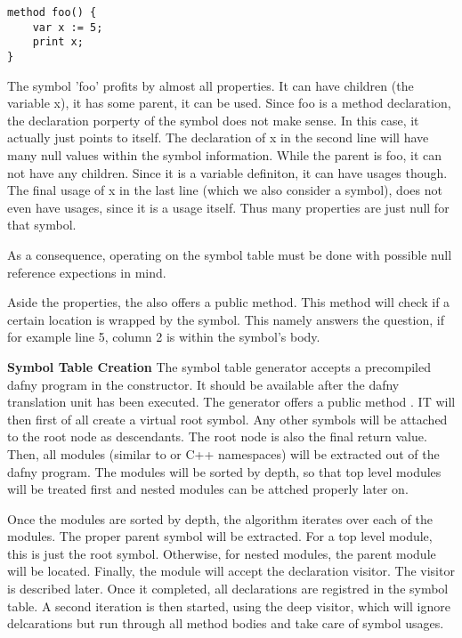 \begin{lstlisting}[language=dafny, caption={Example Code Regarding Symbol Information}, captionpos=b, label={lst:aldbkajds}]
method foo() {
    var x := 5;
    print x;
}
\end{lstlisting}

The symbol 'foo' profits by almost all properties. It can have children (the variable x), it has some parent, it can be used. Since foo is a method declaration, the declaration porperty of the symbol does not make sense. In this case, it actually just points to itself. The declaration of x in the second line will have many null values within the symbol information. While the parent is foo, it can not have any children. Since it is a variable definiton, it can have usages though. The final usage of x in the last line (which we also consider a symbol), does not even have usages, since it is a usage itself. Thus many properties are just null for that symbol.

As a consequence, operating on the symbol table must be done with possible null reference expections in mind.

Aside the properties, the  also offers a public method. This method will check if a certain location is wrapped by the symbol. This namely answers the question, if for example line 5, column 2 is within the symbol's body.

\textbf{Symbol Table Creation}
The symbol table generator accepts a precompiled dafny program in the constructor. It should be available after the dafny translation unit has been executed. The generator offers a public method . IT will then first of all create a virtual root symbol. Any other symbols will be attached to the root node as descendants. The root node is also the final return value.\\

Then, all modules (similar to \Csharp or C++ namespaces) will be extracted out of the dafny program. The modules will be sorted by depth, so that top level modules will be treated first and nested modules can be attched properly later on.

Once the modules are sorted by depth, the algorithm iterates over each of the modules. The proper parent symbol will be extracted. For a top level module, this is just the root symbol. Otherwise, for nested modules, the parent module will be located. Finally, the module will accept the declaration visitor. The visitor is described later. Once it completed, all declarations are registred in the symbol table. A second iteration is then started, using the deep visitor, which will ignore delcarations but run through all method bodies and take care of symbol usages.

